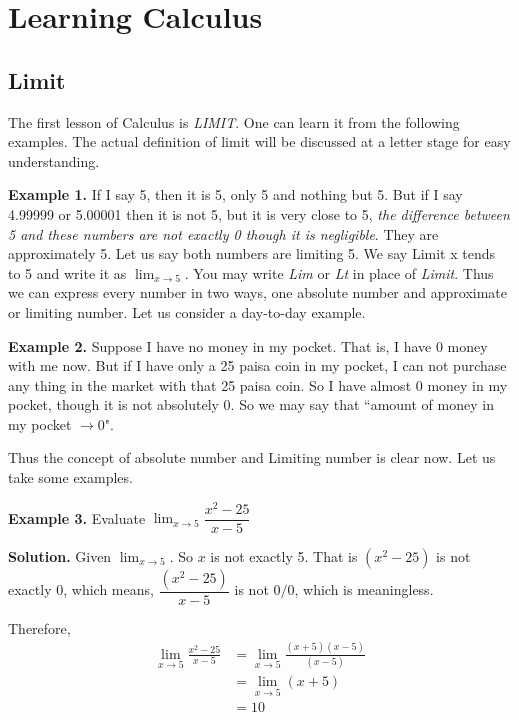 \documentclass[../../main.tex]{subfiles}
\begin{document}
\chapter{Learning Calculus}\vspace{.1cm}

\section{Limit}
The first lesson of Calculus is \textit{LIMIT}. One can learn it from the following examples. The actual definition of limit will be discussed at a letter stage for easy understanding.

\vspace{0.2cm}
\textbf{Example 1.} If I say 5, then it is 5, only 5 and nothing but 5. But if I say 4.99999 or 5.00001 then it is not 5, but it is very close to 5, \textit{the difference between 5 and these numbers are not exactly 0 though it is negligible}. They are approximately 5. Let us say both numbers are limiting 5. We say Limit x tends to 5 and write it as $\lim_{x \to 5}$. You may write \emph{Lim } or \textit{Lt} in place of \textit{Limit}.
Thus we can express every number in two ways, one absolute number and approximate or limiting number. Let us consider a day-to-day example.

\vspace{0.2cm}
\textbf{Example 2.} 
Suppose I have no money in my pocket. That is, I have 0 money with me now. But if I have only a 25 paisa coin in my pocket, I can not purchase any thing in the market with that 25 paisa coin. So I have almost 0 money in my pocket, though it is not absolutely 0. So we may say that ``amount of money in my pocket  $\rightarrow 0$".

Thus the concept of absolute number and Limiting number is clear now. Let us take some examples.
            
\vspace{0.2cm}
\textbf{Example 3.}  
\vspace{0.2cm}  
Evaluate $\lim_{x \to 5}\dfrac{x^2-25}{x-5}$

\textbf{Solution.} Given $\lim_{x \rightarrow 5}$. So $x$ is not exactly 5. That is ${(x^2-25)}$ is not exactly 0, 
 which means, $\dfrac{(x^2-25)}{x-5}$ is not $0/0$, which is meaningless. 

Therefore, 
\begin{align*}
    \lim_{x \to 5} \frac{x^2-25}{x-5} &= \lim_{x \to 5} \frac{(x+5)(x-5)}{(x-5)} \\ 
        &= \lim_{x\to5} (x+5) \\
        &= 10
\end{align*}
\end{document}
